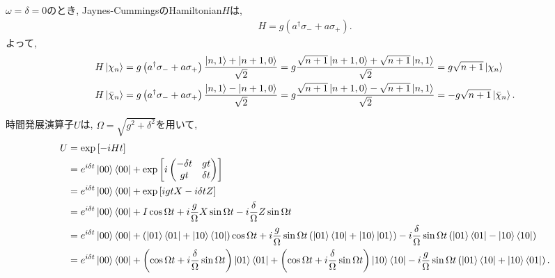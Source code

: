 \begin{ex}
    \label{ex7.17}
    $\omega = \delta = 0$のとき, Jaynes-CummingsのHamiltonian$H$は,
    \begin{align*}
        H = g \left( a^\dagger \sigma_- + a \sigma_+\right).
    \end{align*}
    よって,
    \begin{align*}
        H\ket{\chi_n}
         & =
        g \left( a^\dagger \sigma_- + a \sigma_+\right) \frac{\ket{n,1} + \ket{n+1, 0}}{\sqrt{2}}
        =
        g \frac{ \sqrt{n+1} \ket{n+1,0} + \sqrt{n+1}\ket{n, 1}}{\sqrt{2}}
        =
        g\sqrt{n+1}\ket{\chi_n}
        \\
        H\ket{\bar{\chi}_n}
         & =
        g \left( a^\dagger \sigma_- + a \sigma_+\right) \frac{\ket{n,1} - \ket{n+1, 0}}{\sqrt{2}}
        =
        g \frac{ \sqrt{n+1} \ket{n+1,0} - \sqrt{n+1}\ket{n, 1}}{\sqrt{2}}
        =
        -g\sqrt{n+1}\ket{\bar{\chi}_n}.
    \end{align*}
\end{ex}

\begin{ex}
    \label{ex7.18}
    時間発展演算子$U$は, $\Omega = \sqrt{g^2 + \delta^2}$を用いて,
    \begin{align*}
        U & =
        \exp \left[ - i H t \right]
        \\
          & =
        e^{ i \delta t } \ket{00}\bra{00}
        +
        \exp \left[
            i
            \begin{pmatrix}
                - \delta t & g t      \\
                gt         & \delta t
            \end{pmatrix}
            \right] \\
          & =
        e^{ i \delta t } \ket{00}\bra{00}+
        \exp \left[
            igt X - i\delta t Z
            \right] \\
          & =
        e^{ i \delta t } \ket{00}\bra{00}+
        I \cos \Omega t + i \frac{g}{\Omega} X \sin \Omega t - i \frac{\delta}{\Omega} Z \sin \Omega t
        \\
          & =
        e^{ i \delta t } \ket{00}\bra{00}+
        \left( \ket{01} \bra{01} + \ket{10}\bra{10}\right)\cos \Omega t
        + i \frac{g}{\Omega} \sin \Omega t  \left( \ket{01}\bra{10} + \ket{10}\ket{01}\right)
        - i \frac{\delta}{\Omega} \sin \Omega t \left( \ket{01} \bra{01} -\ket{10}\bra{10}\right)
        \\
          & =
        e^{ i \delta t } \ket{00}\bra{00}+
        \left( \cos \Omega t + i \frac{\delta}{\Omega} \sin\Omega t\right) \ket{01}\bra{01}
        +
        \left( \cos \Omega t + i \frac{\delta}{\Omega} \sin\Omega t\right) \ket{10}\bra{10}
        -
        i \frac{g}{\Omega} \sin\Omega t \left( \ket{01}\bra{10} + \ket{10}\bra{01}\right).
    \end{align*}
\end{ex}

